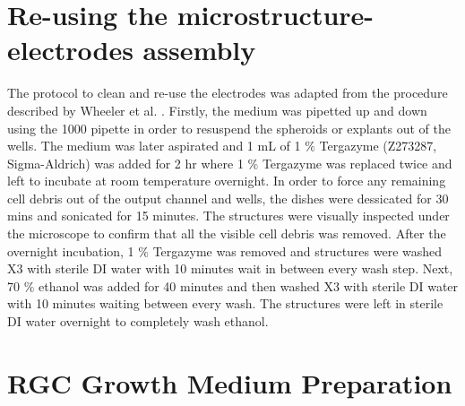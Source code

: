 \documentclass{book}
\begin{document}
\section{Re-using the microstructure-electrodes assembly}

The protocol to clean and re-use the electrodes was adapted from the procedure described by Wheeler et al. \cite{dworak2009novel}. Firstly, the medium was pipetted up and down using the 1000 pipette in order to resuspend the spheroids or explants out of the wells. The medium was later aspirated and 1 mL of 1 $\%$ Tergazyme (Z273287, Sigma-Aldrich) was added for 2 hr where 1 $\%$ Tergazyme was replaced twice and left to incubate at room temperature overnight. In order to force any remaining cell debris out of the output channel and wells, the dishes were dessicated for 30 mins and sonicated for 15 minutes. The structures were visually inspected under the microscope to confirm that all the visible cell debris was removed. After the overnight incubation, 1 $\%$ Tergazyme was removed and structures were washed X3 with sterile DI water with 10 minutes wait in between every wash step. Next, 70 $\%$ ethanol was added for 40 minutes and then washed X3 with sterile DI water with 10 minutes waiting between every wash. The structures were left in sterile DI water overnight to completely wash ethanol. 


\section{RGC Growth Medium Preparation}
\end{document}

